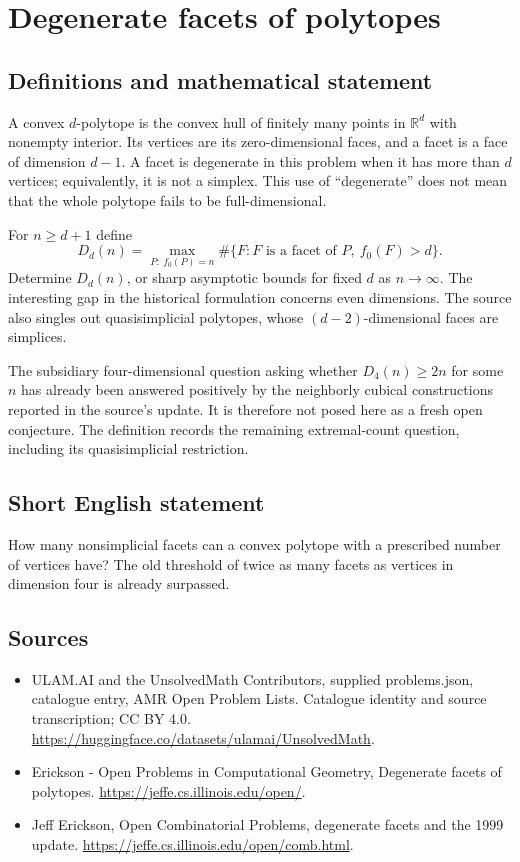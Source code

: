\documentclass[11pt,a4paper]{article}
\begin{document}
\section*{Degenerate facets of polytopes}\label{statement}

\subsection{Definitions and mathematical statement}
A convex $d$-polytope is the convex hull of finitely many points in
$\mathbb R^d$ with nonempty interior. Its vertices are its zero-dimensional
faces, and a facet is a face of dimension $d-1$. A facet is degenerate in
this problem when it has more than $d$ vertices; equivalently, it is not a
simplex. This use of ``degenerate'' does not mean that the whole polytope
fails to be full-dimensional.

For $n\ge d+1$ define
\[
 D_d(n)=\max_{P:\ f_0(P)=n}
 \#\{F:F\text{ is a facet of }P,\ f_0(F)>d\}.
\]
Determine $D_d(n)$, or sharp asymptotic bounds for fixed $d$ as $n\to\infty$.
The interesting gap in the historical formulation concerns even dimensions.
The source also singles out quasisimplicial polytopes, whose
$(d-2)$-dimensional faces are simplices.

The subsidiary four-dimensional question asking whether $D_4(n)\ge2n$ for
some $n$ has already been answered positively by the neighborly cubical
constructions reported in the source's update. It is therefore not posed
here as a fresh open conjecture. The definition records the remaining
extremal-count question, including its quasisimplicial restriction.
\subsection{Short English statement}
How many nonsimplicial facets can a convex polytope with a prescribed
number of vertices have? The old threshold of twice as many facets as
vertices in dimension four is already surpassed.
\subsection{Sources}
\begin{itemize}
\item[S1] ULAM.AI and the UnsolvedMath Contributors, supplied problems.json, catalogue entry, AMR Open Problem Lists. Catalogue identity and source transcription; CC BY 4.0.
\url{https://huggingface.co/datasets/ulamai/UnsolvedMath}.
\item[S2] Erickson - Open Problems in Computational Geometry, Degenerate facets of polytopes. 
\url{https://jeffe.cs.illinois.edu/open/}.
\item[S3] Jeff Erickson, Open Combinatorial Problems, degenerate facets and the 1999 update.
\url{https://jeffe.cs.illinois.edu/open/comb.html}.
\end{itemize}
\end{document}
